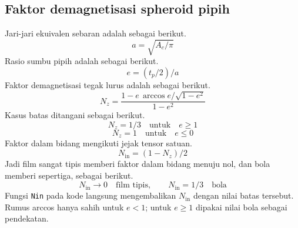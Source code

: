 \documentclass[a4paper,11pt]{article}
\begin{document}
\subsection{Faktor demagnetisasi spheroid pipih}
Jari-jari ekuivalen sebaran adalah sebagai berikut.
\begin{equation*}
a = \sqrt{A_{c}/\pi}
\end{equation*}
Rasio sumbu pipih adalah sebagai berikut.
\begin{equation*}
e = (t_{p}/2)/a
\end{equation*}
Faktor demagnetisasi tegak lurus adalah sebagai berikut.
\begin{equation*}
N_{z} = \frac{1-e\,\arccos e/\sqrt{1-e^{2}}}{1-e^{2}}
\end{equation*}
Kasus batas ditangani sebagai berikut.
\begin{equation*}
N_{z} = 1/3\quad\text{untuk}\quad e\ge 1
\end{equation*}
\begin{equation*}
N_{z} = 1\quad\text{untuk}\quad e\le 0
\end{equation*}
Faktor dalam bidang mengikuti jejak tensor satuan.
\begin{equation*}
N_{\mathrm{in}} = (1-N_{z})/2
\end{equation*}
Jadi film sangat tipis memberi faktor dalam bidang menuju nol,
dan bola memberi sepertiga, sebagai berikut.
\begin{equation*}
N_{\mathrm{in}}\to 0\quad\text{film tipis},\qquad
N_{\mathrm{in}} = 1/3\quad\text{bola}
\end{equation*}
Fungsi \texttt{Nin} pada kode langsung
mengembalikan $N_{\mathrm{in}}$ dengan nilai batas tersebut.
Rumus arccos hanya sahih untuk $e<1$; untuk $e\ge 1$ dipakai nilai bola
sebagai pendekatan.
\end{document}
